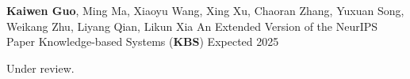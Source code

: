 


\newcommand{\papersaddspace}[0]{
  \vspace{5.5mm}
}



\begin{cventries}

  \cventry
  {\textbf{Kaiwen Guo}, Ming Ma, Xiaoyu Wang, Xing Xu, Chaoran Zhang, Yuxuan Song, Weikang Zhu, Liyang Qian, Likun Xia} %
  {An Extended Version of the NeurIPS Paper} %
  {Knowledge-based Systems (\textbf{KBS})} %
  {Expected 2025} %
  {
    \begin{cvitems}
      \item{Under review.}
    \end{cvitems}
  }
  \papersaddspace


\end{cventries}
